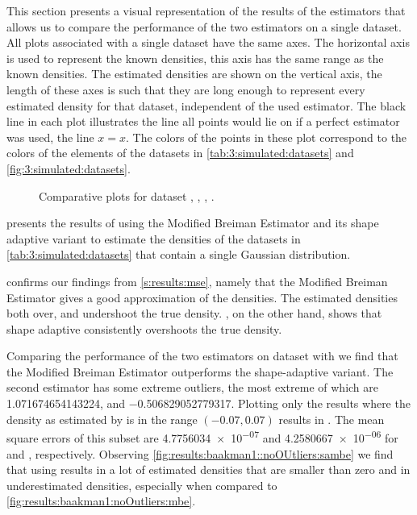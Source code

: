 This section presents a visual representation of the results of the estimators that allows us to compare the performance of the two estimators on a single dataset. All plots associated with a single dataset have the same axes. The horizontal axis is used to represent the known densities, this axis has the same range as the known densities. The estimated densities are shown on the vertical axis, the length of these axes is such that they are long enough to represent every estimated density for that dataset, independent of the used estimator. The black line in each plot illustrates the line all points would lie on if a perfect estimator was used, \ie the line $x = x$. The colors of the points in these plot correspond to the colors of the elements of the datasets in \cref{tab:3:simulated:datasets} and \cref{fig:3:simulated:datasets}.

	\begin{figure}
		\centering
		
		\caption{Comparative plots for dataset \ferdosiOne, \baakmanOne, \baakmanFour, \baakmanFive.}
		\label{fig:4:results:singleSphere}
	\end{figure}

	 presents the results of using the Modified Breiman Estimator and its shape adaptive variant to estimate the densities of the datasets in \cref{tab:3:simulated:datasets} that contain a single Gaussian distribution. 

		 confirms our findings from \cref{s:results:mse}, namely that the Modified Breiman Estimator gives a good approximation of the densities. The estimated densities both over, and undershoot the true density. , on the other hand, shows that shape adaptive \mbe consistently overshoots the true density. 

		Comparing the performance of the two estimators on dataset \numberstringnum{\baakmanOneNum} with  we find that the Modified Breiman Estimator outperforms the shape-adaptive variant. The second estimator has some extreme outliers, the most extreme of which are \num{1.071674654143224}, and \num{-0.506829052779317}. 
		Plotting only the results where the density as estimated by \sambe is in the range $\left(\num[round-precision=1]{-0.07}, \num[round-precision=1]{0.07} \right)$ results in . The mean square errors of this subset are \num{4.7756034e-07} and \num{4.2580667e-06} for \mbe and \sambe, respectively. Observing \cref{fig:results:baakman1::noOUtliers:sambe} we find that using \sambe results in a lot of estimated densities that are smaller than zero and in underestimated densities, especially when compared to \cref{fig:results:baakman1:noOutliers:mbe}.


